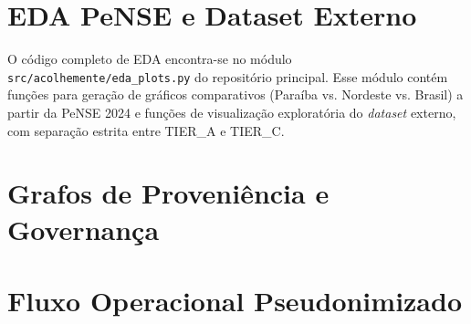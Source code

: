 \documentclass[
    12pt,
    openright,
    oneside,
    a4paper,
    english,
    brazil
]{abntex2}
\begin{document}
\begin{apendicesenv}
\chapter{EDA PeNSE e Dataset Externo}
\label{ap:eda}
O c\'odigo completo de EDA encontra-se no m\'odulo \texttt{src/acolhemente/eda\_plots.py} do reposit\'orio principal. Esse m\'odulo cont\'em fun\c{c}\~oes para gera\c{c}\~ao de gr\'aficos comparativos (Para\'iba vs. Nordeste vs. Brasil) a partir da PeNSE 2024 e fun\c{c}\~oes de visualiza\c{c}\~ao explorat\'oria do \textit{dataset} externo, com separa\c{c}\~ao estrita entre TIER\_A e TIER\_C.

\chapter{Grafos de Proveni\^encia e Governan\c{c}a}
\label{ap:grafos_gov}


\chapter{Fluxo Operacional Pseudonimizado}
\label{ap:pseudonimizacao}


\end{apendicesenv}
\end{document}
